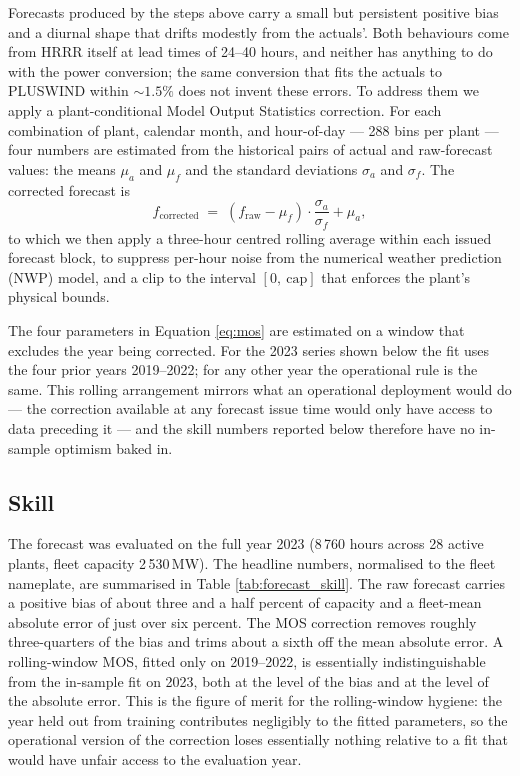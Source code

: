 \documentclass[11pt]{article}
\begin{document}
Forecasts produced by the steps above carry a small but persistent
positive bias and a diurnal shape that drifts modestly from the
actuals'. Both behaviours come from HRRR itself at lead times of
24--40 hours, and neither has anything to do with the power conversion;
the same conversion that fits the actuals to PLUSWIND within $\sim
1.5\%$ does not invent these errors. To address them we apply a
plant-conditional Model Output Statistics correction. For each
combination of plant, calendar month, and hour-of-day --- 288 bins per
plant --- four numbers are estimated from the historical pairs of
actual and raw-forecast values: the means $\mu_a$ and $\mu_f$ and the
standard deviations $\sigma_a$ and $\sigma_f$. The corrected forecast
is
\begin{equation}
  f_\text{corrected} \;=\;
    (f_\text{raw} - \mu_f) \cdot \frac{\sigma_a}{\sigma_f} + \mu_a,
  \label{eq:mos}
\end{equation}
to which we then apply a three-hour centred rolling average within
each issued forecast block, to suppress per-hour noise from the
numerical weather prediction (NWP) model, and a clip to the interval
$[0,\ \text{cap}]$ that enforces the plant's physical bounds.

The four parameters in Equation \ref{eq:mos} are estimated on a window
that excludes the year being corrected. For the 2023 series shown
below the fit uses the four prior years 2019--2022; for any other
year the operational rule is the same. This rolling arrangement
mirrors what an operational deployment would do --- the correction
available at any forecast issue time would only have access to data
preceding it --- and the skill numbers reported below therefore have
no in-sample optimism baked in.

\subsection{Skill}

The forecast was evaluated on the full year 2023 (8\,760 hours across
28 active plants, fleet capacity 2\,530\,MW). The headline numbers,
normalised to the fleet nameplate, are summarised in Table
\ref{tab:forecast_skill}. The raw forecast carries a positive bias of
about three and a half percent of capacity and a fleet-mean absolute
error of just over six percent. The MOS correction removes
roughly three-quarters of the bias and trims about a sixth
off the mean absolute error. A rolling-window MOS, fitted only on
2019--2022, is essentially indistinguishable from the in-sample fit
on 2023, both at the level of the bias and at the level of the
absolute error. This is the figure of merit for the rolling-window
hygiene: the year held out from training contributes negligibly to
the fitted parameters, so the operational version of the correction
loses essentially nothing relative to a fit that would have unfair
access to the evaluation year.
\end{document}
